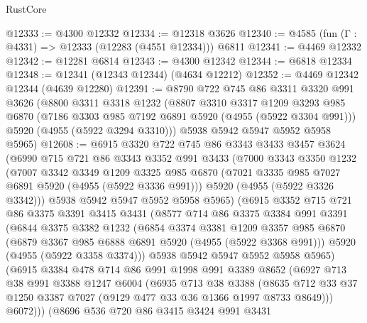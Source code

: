 \begin{lexlean}{RustCore}
\begin{coremodule}
@12333 := @4300 @12332
@12334 := @12318 @3626
@12340 := @4585 (fun (Γ : @4331) => @12333 (@12283 (@4551 @12334))) @6811
@12341 := @4469 @12332
@12342 := @12281 @6814
@12343 := @4300 @12342
@12344 := @6818 @12334
@12348 := @12341 (@12343 @12344) (@4634 @12212)
@12352 := @4469 @12342 @12344 (@4639 @12280)
@12391 := @8790
    @722
    @745
    @86
    @3311
    @3320
    @991
    @3626
    (@8800
      @3311
      @3318
      @1232
      (@8807
        @3310
        @3317
        @1209
        @3293
        @985
        @6870
        (@7186 @3303 @985 @7192 @6891 @5920 (@4955 (@5922 @3304 @991)))
        @5920
        (@4955 (@5922 @3294 @3310)))
      @5938
      @5942
      @5947
      @5952
      @5958
      @5965)
@12608 := @6915
    @3320
    @722
    @745
    @86
    @3343
    @3433
    @3457
    @3624
    (@6990
      @715
      @721
      @86
      @3343
      @3352
      @991
      @3433
      (@7000
        @3343
        @3350
        @1232
        (@7007
          @3342
          @3349
          @1209
          @3325
          @985
          @6870
          (@7021 @3335 @985 @7027 @6891 @5920 (@4955 (@5922 @3336 @991)))
          @5920
          (@4955 (@5922 @3326 @3342)))
        @5938
        @5942
        @5947
        @5952
        @5958
        @5965)
      (@6915
        @3352
        @715
        @721
        @86
        @3375
        @3391
        @3415
        @3431
        (@8577
          @714
          @86
          @3375
          @3384
          @991
          @3391
          (@6844
            @3375
            @3382
            @1232
            (@6854
              @3374
              @3381
              @1209
              @3357
              @985
              @6870
              (@6879 @3367 @985 @6888 @6891 @5920 (@4955 (@5922 @3368 @991)))
              @5920
              (@4955 (@5922 @3358 @3374)))
            @5938
            @5942
            @5947
            @5952
            @5958
            @5965)
          (@6915
            @3384
            @478
            @714
            @86
            @991
            @1998
            @991
            @3389
            @8652
            (@6927
              @713
              @38
              @991
              @3388
              @1247
              @6004
              (@6935
                @713
                @38
                @3388
                (@8635 @712 @33 @37 @1250 @3387 @7027 (@9129 @477 @33 @36 @1366 @1997 @8733 @8649)))
              @6072)))
        (@8696
          @536
          @720
          @86
          @3415
          @3424
          @991
          @3431

\end{coremodule}
\end{lexlean}
